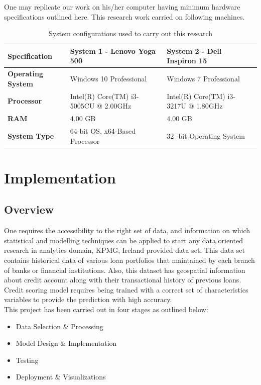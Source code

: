 One may replicate our work on his/her computer having minimum hardware specifications outlined here. This research work carried on following machines. 

\begin{table}[!htb]
\centering
\caption{System configurations used to carry out this research}
\label{osc4}
\begin{tabular}{|p{3cm}|p{5cm}|p{5cm}|}
\toprule
\textbf{Specification}    & \textbf{System 1 - Lenovo Yoga 500}   & \textbf{System 2 - Dell Inspiron 15} \\ \midrule
\textbf{Operating System} & Windows 10 Professional               & Windows 7 Professional               \\
\textbf{Processor}        & Intel(R) Core(TM) i3-5005CU @ 2.00GHz & Intel(R) Core(TM) i3-3217U @ 1.80GHz \\
\textbf{RAM}              & 4.00 GB                               & 4.00 GB                              \\
\textbf{System Type}      & 64-bit OS, x64-Based Processor        & 32 -bit Operating System             \\ \bottomrule
\end{tabular}
\end{table}


\section{Implementation}\label{ch4.3}

\subsection{Overview}
One requires the accessibility to the right set of data, and information on which statistical and modelling techniques can be applied to start any data oriented research in analytics domain, KPMG, Ireland provided data set. This data set contains historical data of various loan portfolios that maintained by each branch of banks or financial institutions. Also, this dataset has geospatial information about credit account along with their transactional history of previous loans. Credit scoring model requires being trained with a correct set of characteristics variables to provide the prediction with high accuracy.\\

This project has been carried out in four stages as outlined below:
\begin{itemize}
  \item Data Selection \& Processing
  \item Model Design \& Implementation
  \item Testing
  \item Deployment \& Visualizations
\end{itemize}


